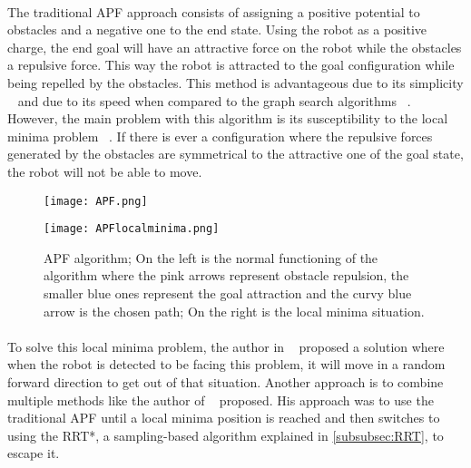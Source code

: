 \paragraph{}The traditional \gls{APF} approach consists of assigning a positive potential to obstacles and a negative one to the end state. Using the robot as a positive charge, 
the end goal will have an attractive force on the robot while the obstacles a repulsive force. 
This way the robot is attracted to the goal configuration while being repelled by the obstacles. 
This method is advantageous due to its simplicity ~\cite{9830995} and due to its speed when compared to the graph search algorithms ~\cite{100007}. 
However, the main problem with this algorithm is its susceptibility to the local minima problem ~\cite{9830995, 100007}. 
If there is ever a configuration where the repulsive forces generated by the obstacles are symmetrical to the attractive one of the goal state, 
the robot will not be able to move.
\begin{figure}[htbp]
    \centering
    \begin{minipage}[b]{0.45\textwidth}
        \centering
        \texttt{[image: APF.png]} %
    \end{minipage}
    \begin{minipage}[b]{0.45\textwidth}
        \centering
        \texttt{[image: APFlocalminima.png]} %
    \end{minipage}
    \caption{APF algorithm; On the left is the normal functioning of the algorithm where the pink arrows represent obstacle repulsion, the smaller blue ones represent the goal attraction and the curvy blue arrow is the chosen path; On the right is the local minima situation.}
    \label{fig:APF}
\end{figure}

\paragraph{}To solve this local minima problem, the author in ~\cite{9734712} proposed a solution where when the robot is detected to be facing this problem, 
it will move in a random forward direction to get out of that situation. Another approach is to combine multiple methods like the author of ~\cite{8763966} proposed. 
His approach was to use the traditional \gls{APF} until a local minima position is reached and then switches to using the RRT*, a sampling-based algorithm explained in \ref{subsubsec:RRT}, 
to escape it.
